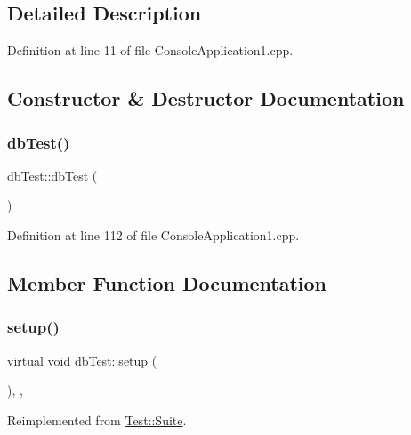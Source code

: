 \subsection{Detailed Description}


Definition at line 11 of file Console\+Application1.\+cpp.



\subsection{Constructor \& Destructor Documentation}
\mbox{\label{classdb_test_aef2697ca1fc1a9368f220d8b5e62402d}} 
\subsubsection{\texorpdfstring{db\+Test()}{dbTest()}}
{\footnotesize\ttfamily db\+Test\+::db\+Test (\begin{DoxyParamCaption}{ }\end{DoxyParamCaption})\hspace{0.3cm}{\ttfamily [inline]}}



Definition at line 112 of file Console\+Application1.\+cpp.



\subsection{Member Function Documentation}
\mbox{\label{classdb_test_aeefb6e8d64ee6e03da89cb5573d60b31}} 
\subsubsection{\texorpdfstring{setup()}{setup()}}
{\footnotesize\ttfamily virtual void db\+Test\+::setup (\begin{DoxyParamCaption}{ }\end{DoxyParamCaption})\hspace{0.3cm}{\ttfamily [inline]}, {\ttfamily [protected]}, {\ttfamily [virtual]}}



Reimplemented from \mbox{\hyperlink{class_test_1_1_suite_aa022f93f2bc7c0ca4f8bf0bb94758226}{Test\+::\+Suite}}.



